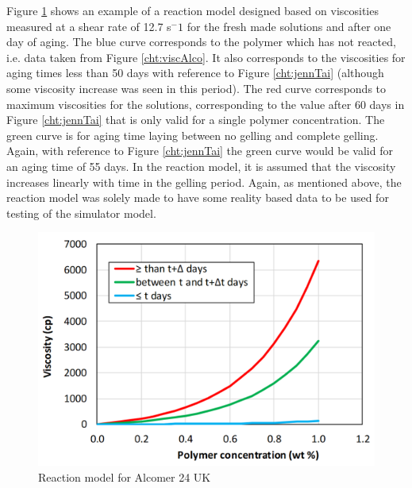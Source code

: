 \documentclass[journal = enfuem, manuscript =  article]{achemso}
\begin{document}
Figure \ref{cht:viscPolcModel} shows an example of a reaction model designed based on viscosities measured at a shear rate of 12.7 s$^-1$ for the fresh made solutions and after one day of aging. The blue curve corresponds to the polymer which has not reacted, i.e. data taken from Figure \ref{cht:viscAlco}. It also corresponds to the viscosities for aging times less than 50 days with reference to Figure \ref{cht:jennTai} (although some viscosity increase was seen in this period). The red curve corresponds to maximum viscosities for the solutions, corresponding to the value after 60 days in Figure \ref{cht:jennTai} that is only valid for a single polymer concentration. The green curve is for aging time laying between no gelling and complete gelling. Again, with reference to Figure \ref{cht:jennTai} the green curve would be valid for an aging time of 55 days. In the reaction model, it is assumed that the viscosity increases linearly with time in the gelling period. Again, as mentioned above, the reaction model was solely made to have some reality based data to be used for testing of the simulator model. 

\begin{figure}
    \centering
    \includegraphics[width=.75\textwidth]{fig/viscPolcModel.png}
    \caption{Reaction model for Alcomer 24 UK}
    \label{cht:viscPolcModel}
\end{figure}
\end{document}
